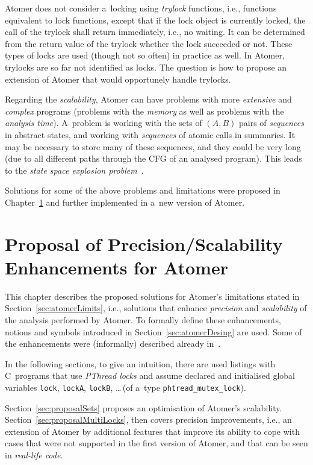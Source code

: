 Atomer does not consider a~locking using \emph{trylock} functions,
i.e., functions equivalent to lock functions, except that if the lock object
is currently locked, the call of the trylock shall return immediately, i.e.,
no waiting. It can be determined from the return value of the trylock whether
the lock succeeded or not. These types of locks are used (though not so often)
in practice as well. In Atomer, trylocks are so far not identified as locks.
The question is how to propose an extension of Atomer that would opportunely
handle trylocks.

Regarding the \emph{scalability}, Atomer can have problems with more
\emph{extensive} and \emph{complex} programs (problems with the \emph{memory}
as well as problems with the \emph{analysis time}). A~problem is working with
the sets of ${ (A, B) }$ pairs of \emph{sequences} in abstract states, and
working with \emph{sequences} of atomic calls in summaries. It may be
necessary to store many of these sequences, and they could be very long (due
to all different paths through the CFG of an analysed program). This leads to
the \emph{state space explosion problem}~\cite{stateExpl}.

Solutions for some of the above problems and limitations were proposed in
Chapter~\ref{chap:proposal} and further implemented in a~new version of
Atomer.



\chapter{Proposal of Precision/Scalability Enhancements for Atomer}
\label{chap:proposal}

This chapter describes the proposed solutions for Atomer's limitations
stated in Section~\ref{sec:atomerLimits}, i.e., solutions that enhance
\emph{precision} and \emph{scalability} of the analysis performed by Atomer.
To formally define these enhancements, notions and symbols introduced in
Section~\ref{sec:atomerDesing} are used. Some of the enhancements were
(informally) described already in~\cite{ppHarmim2020}.

In the following sections, to give an intuition, there are used listings with
C~programs that use \emph{PThread locks} and assume declared and initialised
global variables \texttt{lock}, \texttt{lockA}, \texttt{lockB}, \ldots\,(of
a~type \texttt{phtread\_mutex\_lock}).

Section~\ref{sec:proposalSets} proposes an optimisation of Atomer's
scalability. Section~\ref{sec:proposalMultiLocks}, then covers
precision improvements, i.e., an extension of Atomer by additional
features that improve its ability to cope with cases that were not supported
in the first version of Atomer, and that can be seen in \emph{real-life
code}.

